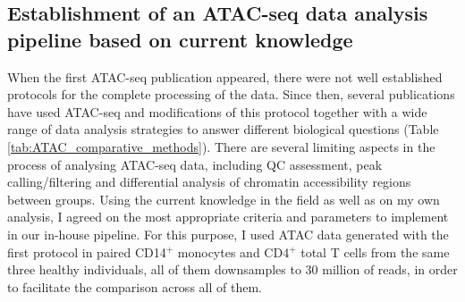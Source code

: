 \subsection{Establishment of an ATAC-seq data analysis pipeline based on current knowledge}
When the first ATAC-seq publication \parencite{Buenrostro2013} appeared, there were not well established protocols for the complete processing of the data. Since then, several publications have used ATAC-seq and modifications of this protocol together with a wide range of data analysis strategies to answer different biological questions (Table \ref{tab:ATAC_comparative_methods}).
There are several limiting aspects in the process of analysing ATAC-seq data, including QC assessment, peak calling/filtering and differential analysis of chromatin accessibility regions between groups. Using the current knowledge in the field as well as on my own analysis, I agreed on the most appropriate criteria and parameters to implement in our in-house pipeline. For this purpose, I used ATAC data generated with the first protocol \parencite{Buenrostro2013} in paired CD14$^+$ monocytes and CD4$^+$ total T cells from the same three healthy individuals, all of them downsamples to 30 million of reads, in order to facilitate the comparison across all of them.


